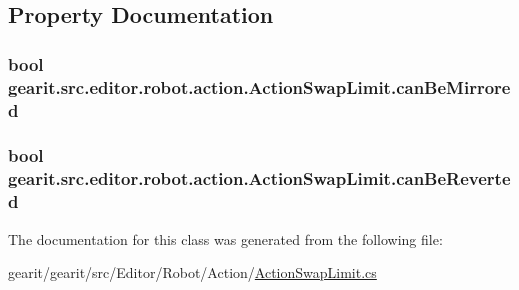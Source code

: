 \subsection{Property Documentation}
\hypertarget{classgearit_1_1src_1_1editor_1_1robot_1_1action_1_1_action_swap_limit_acec40204fea0c848203d5bd91db23633}{
\subsubsection[{can\+Be\+Mirrored}]{\setlength{\rightskip}{0pt plus 5cm}bool gearit.\+src.\+editor.\+robot.\+action.\+Action\+Swap\+Limit.\+can\+Be\+Mirrored\hspace{0.3cm}{\ttfamily [get]}}}\label{classgearit_1_1src_1_1editor_1_1robot_1_1action_1_1_action_swap_limit_acec40204fea0c848203d5bd91db23633}
\hypertarget{classgearit_1_1src_1_1editor_1_1robot_1_1action_1_1_action_swap_limit_a5f9b7fb698b8508f8cfff2b0c79544fa}{
\subsubsection[{can\+Be\+Reverted}]{\setlength{\rightskip}{0pt plus 5cm}bool gearit.\+src.\+editor.\+robot.\+action.\+Action\+Swap\+Limit.\+can\+Be\+Reverted\hspace{0.3cm}{\ttfamily [get]}}}\label{classgearit_1_1src_1_1editor_1_1robot_1_1action_1_1_action_swap_limit_a5f9b7fb698b8508f8cfff2b0c79544fa}


The documentation for this class was generated from the following file\+:\begin{DoxyCompactItemize}
\item 
gearit/gearit/src/\+Editor/\+Robot/\+Action/\hyperlink{_action_swap_limit_8cs}{Action\+Swap\+Limit.\+cs}\end{DoxyCompactItemize}
